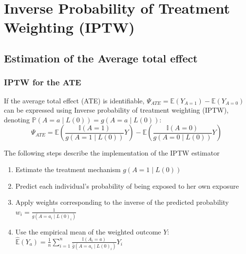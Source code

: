 \documentclass[
]{book}
\begin{document}
\chapter{Inverse Probability of Treatment Weighting (IPTW)}\label{ChapIptw}

\section{Estimation of the Average total effect}\label{estimation-of-the-average-total-effect}

\subsection{IPTW for the ATE}\label{iptw-for-the-ate}

If the average total effect (ATE) is identifiable, \(\Psi_{ATE} = \mathbb{E}(Y_{A=1}) - \mathbb{E}(Y_{A=0})\) can be expressed using Inverse probability of treatment weighting (IPTW), denoting \(\mathbb{P}(A=a \mid L(0)) = g(A=a \mid L(0))\):
\begin{equation}
\Psi_{ATE} = \mathbb{E}\left( \frac{\mathbb{I}(A=1)}{g(A=1 \mid L(0))} Y \right) - \mathbb{E}\left( \frac{\mathbb{I}(A=0)}{g(A=0 \mid L(0))} Y \right)
\end{equation}

The following steps describe the implementation of the IPTW estimator

\begin{enumerate}
\def\labelenumi{\arabic{enumi}.}
\item
  Estimate the treatment mechanism \(g(A=1 \mid L(0))\)
\item
  Predict each individual's probability of being exposed to her own exposure
\item
  Apply weights corresponding to the inverse of the predicted probability \(w_i = \frac{1}{\hat{g}(A = a_i \mid L(0)_i)}\)
\item
  Use the empirical mean of the weighted outcome \(Y\): \(\hat{\mathbb{E}}(Y_a) = \frac{1}{n} \sum_{i=1}^n \frac{\mathbb{I}(A_i=a)}{\hat{g}(A=a_i \mid L(0)_i)} Y_i\)
\end{enumerate}
\end{document}
